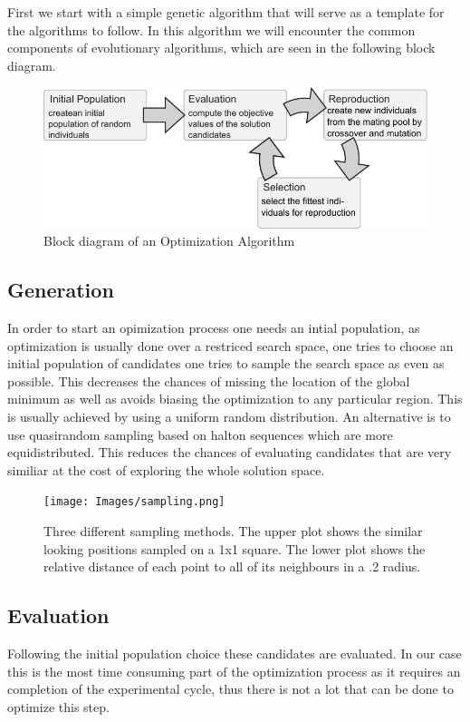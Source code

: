 \documentclass[a4paper,titlepage]{report}
\begin{document}
First we start with a simple genetic algorithm that will serve as a template for the algorithms to follow. In this algorithm we will encounter the common components of evolutionary algorithms, which are seen in the following block diagram. 


\begin{figure}[htb]
\centering
\includegraphics{Images/evolution_v2.pdf}
\caption{Block diagram of an Optimization Algorithm \cite{weise}}
\label{fig: genetic algorithms}
\end{figure}

\subsection{Generation}
In order to start an opimization process one needs an intial population, as optimization is usually done over a restriced search space, one tries to  choose an initial population of candidates one tries to sample the search space as even as possible. This decreases the chances of missing the location of the global minimum as well as avoids biasing the optimization to any particular region. This is usually achieved by using a uniform random distribution. An alternative is to use quasirandom sampling based on halton sequences which are more equidistributed. This reduces the chances of evaluating candidates that are very similiar at the cost of exploring the whole solution space.

\begin{figure}[htb]
\centering
\texttt{[image: Images/sampling.png]}
\caption{Three different sampling methods. The upper plot shows the similar looking positions sampled on a 1x1 square. The lower plot shows the relative distance of each point to all of its neighbours in a .2 radius. \cite{hayes} }
\label{fig: sampling}
\end{figure}

\subsection{Evaluation}
Following the initial population choice these candidates are evaluated. In our case this is the most time consuming part of the optimization process as it requires an completion of the experimental cycle, thus there is not a lot that can be done to optimize this step.
\end{document}
